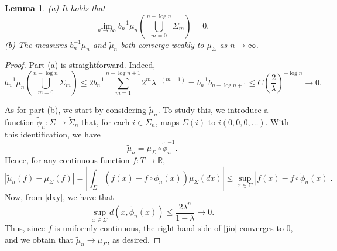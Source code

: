 \documentclass[a4paper, 11pt]{article}
\newtheorem{lem}[theorem]{Lemma}
\begin{document}
\begin{lem}\label{lem22}
(a) It holds that
\[\lim_{n\rightarrow\infty}b_n^{-1}\mu_n\left(\bigcup_{m=0}^{n-\log n}\Sigma_m\right)=0.\]
(b) The measures $b_n^{-1}\mu_n$ and $\tilde{\mu}_n$ both converge weakly to $\mu_\Sigma$ as $n\rightarrow\infty$.
\end{lem}
\begin{proof}
Part (a) is straightforward. Indeed,
\[b_n^{-1}\mu_n\left(\bigcup_{m=0}^{n-\log n}\Sigma_m\right)\leq 2b_n^{-1}\sum_{m=1}^{n-\log n+1}2^m\lambda^{-(m-1)}=b_n^{-1}b_{n-\log n+1}\leq C\left(\frac{2}{\lambda}\right)^{-\log n}\rightarrow 0.\]

As for part (b), we start by considering $\tilde{\mu}_n$. To study this, we introduce a function $\tilde{\phi}_n:\Sigma\rightarrow\tilde{\Sigma}_n$ that, for each $i\in\Sigma_n$, maps $\Sigma(i)$ to $i(0,0,0,\dots)$. With this identification, we have
\[\tilde{\mu}_n=\mu_\Sigma\circ\tilde{\phi}_n^{-1}.\]
Hence, for any continuous function $f:T\rightarrow \mathbb{R}$,
\begin{equation}\label{jio}
\left|\tilde{\mu}_n(f)-\mu_\Sigma(f)\right|=\left|\int_\Sigma \left(f(x)-f\circ\tilde{\phi}_n(x)\right)\mu_\Sigma(dx)\right|\leq \sup_{x\in\Sigma}\left|f(x)-f\circ\tilde{\phi}_n(x)\right|.
\end{equation}
Now, from \eqref{dxy}, we have that
\[\sup_{x\in\Sigma}d\left(x,\tilde{\phi}_n(x)\right)\leq \frac{2\lambda^n}{1-\lambda}\rightarrow0.\]
Thus, since $f$ is uniformly continuous, the right-hand side of \eqref{jio} converges to 0, and we obtain that $\tilde{\mu}_n\rightarrow\mu_{\Sigma}$, as desired.


\end{proof}
\end{document}
